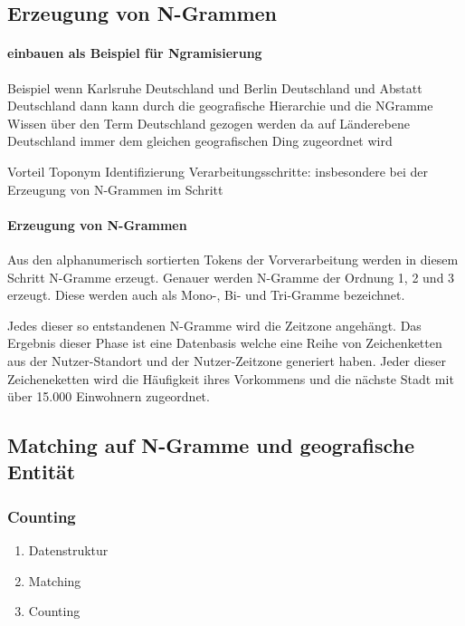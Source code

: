 		\subsection{Erzeugung von N-Grammen}

				\paragraph{einbauen als Beispiel für Ngramisierung} 
				Beispiel wenn Karlsruhe Deutschland und Berlin Deutschland und Abstatt Deutschland dann kann durch die geografische Hierarchie und die NGramme Wissen über den Term Deutschland gezogen werden da auf Länderebene Deutschland immer dem gleichen geografischen Ding zugeordnet wird 

				Vorteil Toponym Identifizierung Verarbeitungsschritte:  insbesondere bei der Erzeugung von N-Grammen im Schritt 

		  		\paragraph{Erzeugung von N-Grammen}
			  	Aus den alphanumerisch sortierten Tokens der Vorverarbeitung werden in diesem Schritt N-Gramme erzeugt.
			  	Genauer werden N-Gramme der Ordnung 1, 2 und 3 erzeugt.
			  	Diese werden auch als Mono-, Bi- und Tri-Gramme bezeichnet.  

			  	Jedes dieser so entstandenen N-Gramme wird die Zeitzone angehängt.  
				Das Ergebnis dieser Phase ist eine Datenbasis welche eine Reihe von Zeichenketten aus der Nutzer-Standort und der Nutzer-Zeitzone generiert haben. 
				Jeder dieser Zeicheneketten wird die Häufigkeit ihres Vorkommens und die nächste Stadt mit über 15.000 Einwohnern zugeordnet. 

				
		\subsection{Matching auf N-Gramme und geografische Entität}

			\subsubsection{Counting} 


	\begin{enumerate}
		\item Datenstruktur
		\item Matching
		\item Counting  
	\end{enumerate}

